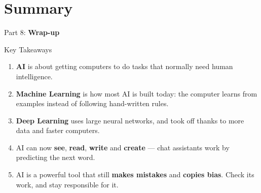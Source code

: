 \section{Summary}
\begin{frame}{}
    \LARGE Part 8: \textbf{Wrap-up}
\end{frame}

\begin{frame}{Key Takeaways}
    \begin{enumerate}
        \setlength\itemsep{0.9em}
        \item \textbf{AI} is about getting computers to do tasks that normally need human intelligence.
        \item \textbf{Machine Learning} is how most AI is built today: the computer learns from examples instead of following hand-written rules.
        \item \textbf{Deep Learning} uses large neural networks, and took off thanks to more data and faster computers.
        \item AI can now \textbf{see}, \textbf{read}, \textbf{write} and \textbf{create} --- chat assistants work by predicting the next word.
        \item AI is a powerful tool that still \textbf{makes mistakes} and \textbf{copies bias}. Check its work, and stay responsible for it.
    \end{enumerate}
\end{frame}

